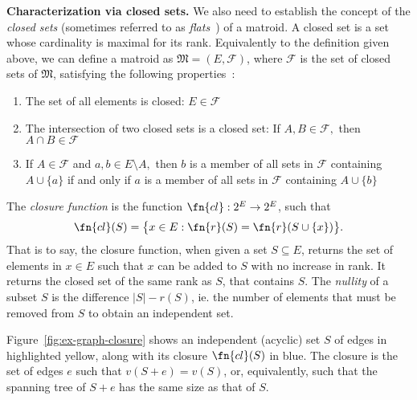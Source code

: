 \textbf{Characterization via closed sets.} We also need to establish the concept of the \textit{closed sets} (sometimes referred to as \textit{flats}~\cite{schrijver-2003}) of a matroid. A closed set is a set whose cardinality is maximal for its rank. Equivalently to the definition given above, we can define a matroid as $\mathfrak{M} = (E, \mathcal{F})$, where $\mathcal{F}$ is the set of closed sets of $\mathfrak{M}$, satisfying the following properties~\cite{knuth-1975}:

\begin{enumerate}
  \item The set of all elements is closed: $E \in \mathcal{F}$
  \item The intersection of two closed sets is a closed set: If $A,B \in \mathcal{F},$ then $A \cap B \in \mathcal{F}$
  \item If $A \in \mathcal{F}$ and $a,b \in E \setminus A,$ then $b$ is a member of all sets in $\mathcal{F}$ containing $A \cup \{a\}$ if and only if $a$ is a member of all sets in $\mathcal{F}$ containing $A \cup \{b\}$
\end{enumerate}

The \textit{closure function} is the function $\fn{cl} : 2^E \to 2^E$, such that $$\fn{cl}(S) = \bigl\{ x \in E : \fn{r}(S) = \fn{r}(S \cup \{x\}) \bigr\}.$$ That is to say, the closure function, when given a set $S \subseteq E$, returns the set of elements in $x \in E$ such that $x$ can be added to $S$ with no increase in rank. It returns the closed set of the same rank as $S$, that contains $S$. The \textit{nullity} of a subset $S$ is the difference $|S| - r(S)$, ie. the number of elements that must be removed from $S$ to obtain an independent set.

Figure~\ref{fig:ex-graph-closure} shows an independent (acyclic) set $S$ of edges in highlighted yellow, along with its closure $\fn{cl}(S)$ in blue. The closure is the set of edges $e$ such that $v(S+e) = v(S)$, or, equivalently, such that the spanning tree of $S+e$ has the same size as that of $S$.

